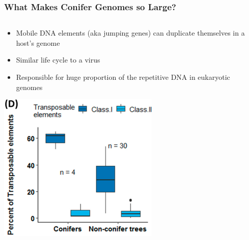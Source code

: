 \documentclass{beamer}
\begin{document}
	
	\begin{frame}
		\frametitle{What Makes Conifer Genomes so Large?}
		\begin{columns}
			\begin{column}{0.7\textwidth}
				\small		
				\begin{itemize}
					\item[] Mobile DNA elements (aka jumping genes) can duplicate themselves in a host’s genome
					\item[] Similar life cycle to a virus
					\item[] Responsible for huge proportion of the repetitive DNA in eukaryotic genomes
				\end{itemize}
				\centering	\includegraphics[keepaspectratio, width  = 0.6\textwidth]{img/transposons.png}\\
			\end{column}
			\begin{column}{0.4\textwidth}

\end{column}
\end{columns}
\end{frame}
\end{document}
